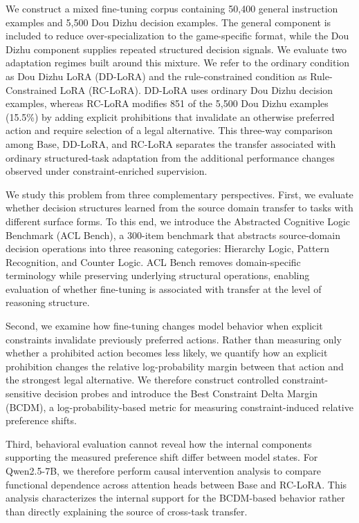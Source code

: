 We construct a mixed fine-tuning corpus containing 50,400 general instruction examples and 5,500 Dou Dizhu decision examples. The general component is included to reduce over-specialization to the game-specific format, while the Dou Dizhu component supplies repeated structured decision signals. We evaluate two adaptation regimes built around this mixture. We refer to the ordinary condition as Dou Dizhu LoRA (DD-LoRA) and the rule-constrained condition as Rule-Constrained LoRA (RC-LoRA). DD-LoRA uses ordinary Dou Dizhu decision examples, whereas RC-LoRA modifies 851 of the 5,500 Dou Dizhu examples (15.5\%) by adding explicit prohibitions that invalidate an otherwise preferred action and require selection of a legal alternative. This three-way comparison among Base, DD-LoRA, and RC-LoRA separates the transfer associated with ordinary structured-task adaptation from the additional performance changes observed under constraint-enriched supervision.

We study this problem from three complementary perspectives. First, we evaluate whether decision structures learned from the source domain transfer to tasks with different surface forms. To this end, we introduce the Abstracted Cognitive Logic Benchmark (ACL Bench), a 300-item benchmark that abstracts source-domain decision operations into three reasoning categories: Hierarchy Logic, Pattern Recognition, and Counter Logic. ACL Bench removes domain-specific terminology while preserving underlying structural operations, enabling evaluation of whether fine-tuning is associated with transfer at the level of reasoning structure.

Second, we examine how fine-tuning changes model behavior when explicit constraints invalidate previously preferred actions. Rather than measuring only whether a prohibited action becomes less likely, we quantify how an explicit prohibition changes the relative log-probability margin between that action and the strongest legal alternative. We therefore construct controlled constraint-sensitive decision probes and introduce the Best Constraint Delta Margin (BCDM), a log-probability-based metric for measuring constraint-induced relative preference shifts.

Third, behavioral evaluation cannot reveal how the internal components supporting the measured preference shift differ between model states. For Qwen2.5-7B, we therefore perform causal intervention analysis to compare functional dependence across attention heads between Base and RC-LoRA. This analysis characterizes the internal support for the BCDM-based behavior rather than directly explaining the source of cross-task transfer.

